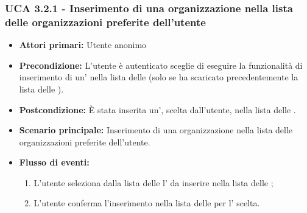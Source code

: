 \subsubsection{UCA 3.2.1 - Inserimento di una organizzazione nella lista delle organizzazioni preferite dell'utente}%
\begin{itemize}
	\item \textbf{Attori primari:} Utente anonimo
	\item \textbf{Precondizione:} L'utente è autenticato sceglie di eseguire la funzionalità di inserimento di un' nella lista delle  (solo se ha scaricato precedentemente la lista delle ).
	\item \textbf{Postcondizione:} È stata inserita un', scelta dall'utente, nella lista delle .
	\item \textbf{Scenario principale:} Inserimento di una organizzazione nella lista delle organizzazioni preferite dell'utente.
	\item \textbf{Flusso di eventi:}
	\begin{enumerate}
		\item L'utente seleziona dalla lista delle  l' da inserire nella lista delle ;
		\item L'utente conferma l'inserimento nella lista delle  per l' scelta.
	\end{enumerate}
\end{itemize}


